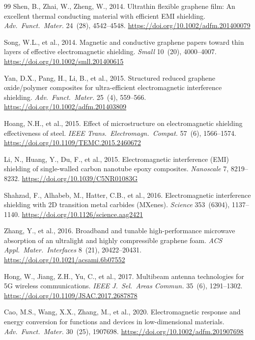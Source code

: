 \documentclass[review,3p,authoryear]{elsarticle}
\begin{document}
\begin{thebibliography}{99}
Shen, B., Zhai, W., Zheng, W., 2014.
Ultrathin flexible graphene film: An excellent thermal conducting material with efficient EMI shielding.
\textit{Adv.\ Funct.\ Mater.} 24~(28), 4542--4548.
\url{https://doi.org/10.1002/adfm.201400079}

Song, W.L., et al., 2014.
Magnetic and conductive graphene papers toward thin layers of effective electromagnetic shielding.
\textit{Small} 10~(20), 4000--4007.
\url{https://doi.org/10.1002/smll.201400615}

Yan, D.X., Pang, H., Li, B., et al., 2015.
Structured reduced graphene oxide/polymer composites for ultra-efficient electromagnetic interference shielding.
\textit{Adv.\ Funct.\ Mater.} 25~(4), 559--566.
\url{https://doi.org/10.1002/adfm.201403809}

Hoang, N.H., et al., 2015.
Effect of microstructure on electromagnetic shielding effectiveness of steel.
\textit{IEEE Trans.\ Electromagn.\ Compat.} 57~(6), 1566--1574.
\url{https://doi.org/10.1109/TEMC.2015.2460672}

Li, N., Huang, Y., Du, F., et al., 2015.
Electromagnetic interference (EMI) shielding of single-walled carbon nanotube epoxy composites.
\textit{Nanoscale} 7, 8219--8232.
\url{https://doi.org/10.1039/C5NR01083G}

Shahzad, F., Alhabeb, M., Hatter, C.B., et al., 2016.
Electromagnetic interference shielding with 2D transition metal carbides (MXenes).
\textit{Science} 353~(6304), 1137--1140.
\url{https://doi.org/10.1126/science.aag2421}

Zhang, Y., et al., 2016.
Broadband and tunable high-performance microwave absorption of an ultralight and highly compressible graphene foam.
\textit{ACS Appl.\ Mater.\ Interfaces} 8~(21), 20422--20431.
\url{https://doi.org/10.1021/acsami.6b07552}

Hong, W., Jiang, Z.H., Yu, C., et al., 2017.
Multibeam antenna technologies for 5G wireless communications.
\textit{IEEE J.\ Sel.\ Areas Commun.} 35~(6), 1291--1302.
\url{https://doi.org/10.1109/JSAC.2017.2687878}

Cao, M.S., Wang, X.X., Zhang, M., et al., 2020.
Electromagnetic response and energy conversion for functions and devices in low-dimensional materials.
\textit{Adv.\ Funct.\ Mater.} 30~(25), 1907698.
\url{https://doi.org/10.1002/adfm.201907698}


\end{thebibliography}
\end{document}

